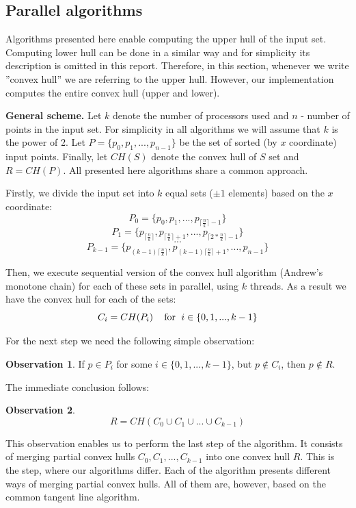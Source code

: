 \documentclass[letterpaper]{article}
\newcommand{\mypar}[1]{{\bf #1.}}
\theoremstyle{definition}
\newtheorem{observation}{Observation}
\begin{document}
\subsection{Parallel algorithms}

Algorithms presented here enable computing the upper hull of the input set. 
Computing lower hull can be done in a similar way and for simplicity its description is omitted in this report. 
Therefore, in this section, whenever we write ''convex hull'' we are referring to the upper hull.
However, our implementation computes the entire convex hull (upper and lower).  

\mypar{General scheme}
Let $k$ denote the number of processors used and $n$ - number of points in the input set.
For simplicity in all algorithms we will assume that $k$ is the power of 2. 
Let $P = \{p_0, p_1, ..., p_{n-1} \}$ be the set of sorted (by $x$ coordinate) input points.
Finally, let $CH(S)$ denote the convex hull of $S$ set and $R=CH(P)$.
All presented here algorithms share a common approach.

Firstly, we divide the input set into $k$ equal sets ($\pm 1$ elements) based on the $x$ coordinate:
$$P_0 = \{p_0, p_1, ..., p_{\lceil{\frac{n}{k}}\rceil - 1}\}$$
$$P_1 = \{p_{\lceil{\frac{n}{k}}\rceil}, p_{\lceil{\frac{n}{k}}\rceil + 1}, ..., p_{\lceil{2 * \frac{n}{k}}\rceil - 1}\}$$
$$...$$
$$P_{k-1} = \{p_{(k-1)\lceil{\frac{n}{k}}\rceil}, p_{(k-1)\lceil{\frac{n}{k}}\rceil + 1}, ..., p_{n- 1} \}$$


Then, we execute sequential version of the convex hull algorithm (Andrew's monotone chain) for each of these sets in parallel, using $k$ threads.
As a result we have the convex hull for each of the sets:
$$C_i = CH(P_i) \textrm{\;\;\; for \;} i \in \{0, 1, ..., k - 1\}$$

For the next step we need the following simple observation:
\begin{observation}
If $p \in P_i$ for some $i \in \{0, 1, ..., k - 1\}$, but $p \notin C_i$, then $p \notin R$.
\end{observation}

The immediate conclusion follows:
\begin{observation}
$$R = CH(C_0 \cup C_1 \cup ... \cup C_{k - 1})$$
\end{observation}

This observation enables us to perform the last step of the algorithm.
It consists of merging partial convex hulls $C_0, C_1, ..., C_{k - 1}$ into one convex hull $R$.
This is the step, where our algorithms differ.
Each of the algorithm presents different ways of merging partial convex hulls.
All of them are, however, based on the common tangent line algorithm.
\end{document}
